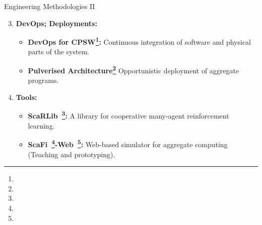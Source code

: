 \documentclass[presentation, 8pt,169]{beamer}\mode<presentation>{\usetheme{AMSBolognaFC}}
\begin{document}
\begin{frame}{Engineering Methodologies II}

  \begin{enumerate}
  \setcounter{enumi}{2}
  \item \textbf{DevOps; Deployments:}
  
  \begin{itemize}
  \item \textbf{DevOps for CPSW\footnote{}:} Continuous integration of software and physical parts of the system.
  \item \textbf{Pulverised Architecture\footnote{}} Opportunistic deployment of aggregate programs.
 
  \end{itemize}
  \framebreak
  \item \textbf{Tools:}
  
  \begin{itemize}
  \item \textbf{ScaRLib~\footnote{}:} A library for cooperative many-agent reinforcement learning.
  \item \textbf{ScaFi~\footnote{}-Web~\footnote{}:} Web-based simulator for aggregate computing (Teaching and prototyping).
  \end{itemize}
\end{enumerate}
\end{frame}
\end{document}
